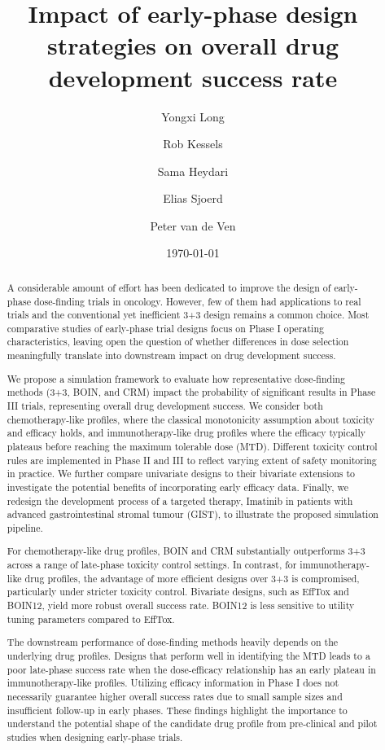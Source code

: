 \documentclass[11pt]{article}
\title{Impact of early-phase design strategies on overall drug development success rate}
\author{Yongxi Long \and Rob Kessels \and Sama Heydari \and Elias Sjoerd \and Peter van de Ven}
\date{\today}
\begin{document}
\maketitle
\begin{abstract}
A considerable amount of effort has been dedicated to improve the design of early-phase dose-finding trials in oncology. However, few of them had applications to real trials and the conventional yet inefficient 3+3 design remains a common choice. Most comparative studies of early-phase trial designs focus on Phase I operating characteristics, leaving open the question of whether differences in dose selection meaningfully translate into downstream impact on drug development success.

We propose a simulation framework to evaluate how representative dose-finding methods (3+3, BOIN, and CRM) impact the probability of significant results in Phase III trials, representing overall drug development success. We consider both chemotherapy-like profiles, where the classical monotonicity assumption about toxicity and efficacy holds, and immunotherapy-like drug profiles where the efficacy typically plateaus before reaching the maximum tolerable dose (MTD). Different toxicity control rules are implemented in Phase II and III to reflect varying extent of safety monitoring in practice. We further compare univariate designs to their bivariate extensions to investigate the potential benefits of incorporating early efficacy data. Finally, we redesign the development process of a targeted therapy, Imatinib in patients with advanced gastrointestinal stromal tumour (GIST), to illustrate the proposed simulation pipeline. 

For chemotherapy-like drug profiles, BOIN and CRM substantially outperforms 3+3 across a range of late-phase toxicity control settings. In contrast, for immunotherapy-like drug profiles, the advantage of more efficient designs over 3+3 is compromised, particularly under stricter toxicity control. Bivariate designs, such as EffTox and BOIN12, yield more robust overall success rate. BOIN12 is less sensitive to utility tuning parameters compared to EffTox.

The downstream performance of dose-finding methods heavily depends on the underlying drug profiles. Designs that perform well in identifying the MTD leads to a poor late-phase success rate when the dose-efficacy relationship has an early plateau in immunotherapy-like profiles. Utilizing efficacy information in Phase I does not necessarily guarantee higher overall success rates due to small sample sizes and insufficient follow-up in early phases. These findings highlight the importance to understand the potential shape of the candidate drug profile from pre-clinical and pilot studies when designing early-phase trials.
\end{abstract}
\end{document}
